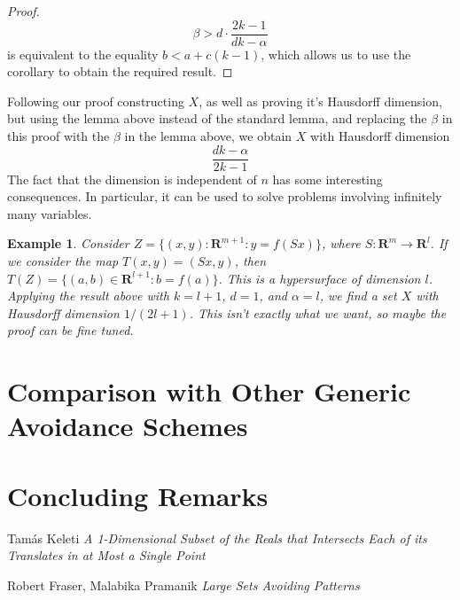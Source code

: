 \documentclass{article}
\theoremstyle{plain}
\newtheorem*{example}{Example}
\theoremstyle{plain}
\newtheorem{theorem}{Theorem}
\begin{document}
\begin{multicols}{2}
\begin{proof}
	\[ \beta > d \cdot \frac{2k - 1}{dk - \alpha} \]
	is equivalent to the equality $b < a + c(k-1)$, which allows us to use the corollary to obtain the required result.
\end{proof}

Following our proof constructing $X$, as well as proving it's Hausdorff dimension, but using the lemma above instead of the standard lemma, and replacing the $\beta$ in this proof with the $\beta$ in the lemma above, we obtain $X$ with Hausdorff dimension
%
\[ \frac{dk - \alpha}{2k - 1} \]
%
The fact that the dimension is independent of $n$ has some interesting consequences. In particular, it can be used to solve problems involving infinitely many variables.

\begin{example}
	Consider $Z = \{ (x,y): \mathbf{R}^{m+1}: y = f(Sx) \}$, where $S: \mathbf{R}^m \to \mathbf{R}^l$. If we consider the map $T(x,y) = (Sx,y)$, then $T(Z) = \{ (a,b) \in \mathbf{R}^{l+1}: b = f(a) \}$. This is a hypersurface of dimension $l$. Applying the result above with $k = l+1$, $d = 1$, and $\alpha = l$, we find a set $X$ with Hausdorff dimension $1/(2l + 1)$. This isn't exactly what we want, so maybe the proof can be fine tuned.
\end{example}


\section{Comparison with Other Generic Avoidance Schemes}

\section{Concluding Remarks}

\begin{thebibliography}{9}

Tam\'{a}s Keleti
\textit{A 1-Dimensional Subset of the Reals that Intersects Each of its Translates in at Most a Single Point}

Robert Fraser, Malabika Pramanik
\textit{Large Sets Avoiding Patterns}


\end{thebibliography}
\end{multicols}
\end{document}
